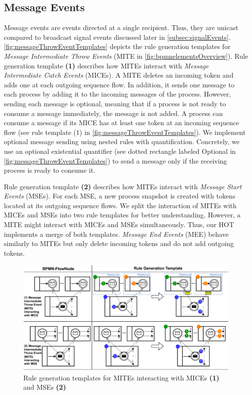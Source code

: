 \documentclass{lmcs} %
\begin{document}
\subsection{Message Events}
Message events are events directed at a single recipient.
Thus, they are unicast compared to broadcast signal events discussed later in \autoref{subsec:signalEvents}.
\autoref{fig:messageThrowEventTemplates} depicts the rule generation templates for \textit{Message Intermediate Throw Events} (\textsf{MITE} in \autoref{fig:bpmnelementsOverview}).
Rule generation template \textbf{(1)} describes how MITEs interact with \textit{Message Intermediate Catch Events} (MICEs).
A MITE deletes an incoming token and adds one at each outgoing sequence flow.
In addition, it sends one message to each process by adding it to the incoming messages of the process.
However, sending each message is optional, meaning that if a process is not ready to consume a message immediately, the message is not added.
A process can consume a message if its MICE has at least one token at an incoming sequence flow (see rule template (1) in \autoref{fig:messageThrowEventTemplates}).
We implement optional message sending using nested rules with quantification.
Concretely, we use an optional existential quantifier \cite{rensinkNestedQuantificationGraph2006} (see dotted rectangle labeled \textsf{Optional} in \autoref{fig:messageThrowEventTemplates}) to send a message only if the receiving process is ready to consume it.

Rule generation template \textbf{(2)} describes how MITEs interact with \textit{Message Start Events} (MSEs).
For each MSE, a new process snapshot is created with tokens located at its outgoing sequence flows.
We split the interaction of MITEs with MICEs and MSEs into two rule templates for better understanding.
However, a MITE might interact with MICEs and MSEs simultaneously.
Thus, our HOT implements a merge of both templates. 
\textit{Message End Events} (\textsf{MEE}) behave similarly to MITEs but only delete incoming tokens and do not add outgoing tokens.

\begin{figure}[ht]
    \centering
    \includegraphics[width=1\textwidth]{images/mite_template.pdf}
    \caption{Rule generation templates for MITEs interacting with MICEs \textbf{(1)} and MSEs \textbf{(2)}}
    \label{fig:messageThrowEventTemplates}
\end{figure}
\end{document}
